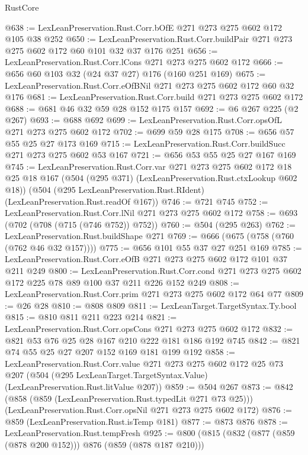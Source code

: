 \begin{lexlean}{RustCore}
\begin{coremodule}
@638 := LexLeanPreservation.Rust.Corr.bOfE @271 @273 @275 @602 @172 @105 @38 @252
@650 := LexLeanPreservation.Rust.Corr.buildPair @271 @273 @275 @602 @172 @60 @101 @32 @37 @176 @251
@656 := LexLeanPreservation.Rust.Corr.lCons @271 @273 @275 @602 @172
@666 := @656 @60 @103 @32 (@24 @37 @27) @176 (@160 @251 @169)
@675 := LexLeanPreservation.Rust.Corr.eOfBNil @271 @273 @275 @602 @172 @60 @32 @176
@681 := LexLeanPreservation.Rust.Corr.build @271 @273 @275 @602 @172
@688 := @681 @46 @32 @59 @28 @152 @175 @157
@692 := @6 @267 @225 (@2 @267)
@693 := @688 @692
@699 := LexLeanPreservation.Rust.Corr.opsOfL @271 @273 @275 @602 @172
@702 := @699 @59 @28 @175
@708 := @656 @57 @55 @25 @27 @173 @169
@715 := LexLeanPreservation.Rust.Corr.buildSucc @271 @273 @275 @602 @53 @167
@721 := @656 @53 @55 @25 @27 @167 @169
@745 := LexLeanPreservation.Rust.Corr.var
    @271
    @273
    @275
    @602
    @172
    @18
    @25
    @18
    @167
    (@504 (@295 @371) (LexLeanPreservation.Rust.ctxLookup @602 @18))
    (@504 (@295 LexLeanPreservation.Rust.RIdent) (LexLeanPreservation.Rust.readOf @167))
@746 := @721 @745
@752 := LexLeanPreservation.Rust.Corr.lNil @271 @273 @275 @602 @172
@758 := @693 (@702 (@708 (@715 (@746 @752)) @752))
@760 := @504 (@295 @263)
@762 := LexLeanPreservation.Rust.buildShape @271
@769 := @666 (@675 (@758 (@760 (@762 @46 @32 @157))))
@775 := @656 @101 @55 @37 @27 @251 @169
@785 := LexLeanPreservation.Rust.Corr.eOfB @271 @273 @275 @602 @172 @101 @37 @211 @249
@800 := LexLeanPreservation.Rust.Corr.cond
    @271
    @273
    @275
    @602
    @172
    @225
    @78
    @89
    @100
    @37
    @211
    @226
    @152
    @249
@808 := LexLeanPreservation.Rust.Corr.prim @271 @273 @275 @602 @172 @64 @77
@809 := @26 @28
@810 := @808 @809
@811 := LexLeanTarget.TargetSyntax.Ty.bool
@815 := @810 @811 @211 @223 @214
@821 := LexLeanPreservation.Rust.Corr.opsCons @271 @273 @275 @602 @172
@832 := @821 @53 @76 @25 @28 @167 @210 @222 @181 @186 @192 @745
@842 := @821 @74 @55 @25 @27 @207 @152 @169 @181 @199 @192
@858 := LexLeanPreservation.Rust.Corr.value
    @271
    @273
    @275
    @602
    @172
    @25
    @73
    @207
    (@504 (@295 LexLeanTarget.TargetSyntax.Value) (LexLeanPreservation.Rust.litValue @207))
@859 := @504 @267
@873 := @842
    (@858 (@859 (LexLeanPreservation.Rust.typedLit @271 @73 @25)))
    (LexLeanPreservation.Rust.Corr.opsNil @271 @273 @275 @602 @172)
@876 := @859 (LexLeanPreservation.Rust.isTemp @181)
@877 := @873 @876
@878 := LexLeanPreservation.Rust.tempFresh
@925 := @800
    (@815
      (@832 (@877 (@859 (@878 @200 @152))) @876 (@859 (@878 @187 @210)))

\end{coremodule}
\end{lexlean}
